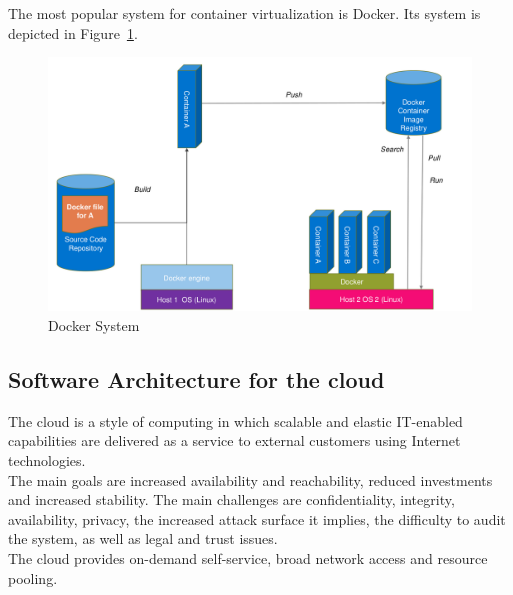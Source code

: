 The most popular system for container virtualization is Docker.
Its system is depicted in Figure~\ref{fig:docker}.
\begin{figure}[H]
  \centering
  \includegraphics[width=.8\textwidth]{images/docker.png}
  \caption{Docker System}\label{fig:docker}
\end{figure}

\subsection{Software Architecture for the cloud}
The cloud is a style of computing in which scalable and elastic IT-enabled capabilities are delivered as a service to external customers using Internet technologies.\\
The main goals are increased availability and reachability, reduced investments and increased stability.
The main challenges are confidentiality, integrity, availability, privacy, the increased attack surface it implies, the difficulty to audit the system, as well as legal and trust issues.\\
The cloud provides on-demand self-service, broad network access and resource pooling.

